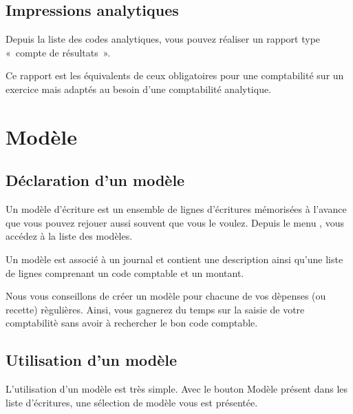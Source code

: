 \documentclass[a4paper,10pt,oneside,french]{sphinxmanual}
\begin{document}
\subsection{Impressions analytiques}
\label{\detokenize{accounting/costaccounting:impressions-analytiques}}
Depuis la liste des codes analytiques, vous pouvez réaliser un rapport type « compte de résultats ».

Ce rapport est les équivalents de ceux obligatoires pour une comptabilité sur un exercice mais adaptés au besoin d’une comptabilité analytique.


\section{Modèle}
\label{\detokenize{accounting/model:modele}}\label{\detokenize{accounting/model::doc}}

\subsection{Déclaration d’un modèle}
\label{\detokenize{accounting/model:declaration-d-un-modele}}
Un modèle d’écriture est un ensemble de lignes d’écritures mémorisées à l’avance que vous pouvez rejouer aussi souvent que vous le voulez.
Depuis le menu , vous accédez à la liste des modèles.
\begin{quote}

\noindent{}
\end{quote}

Un modèle est associé à un journal et contient une description ainsi qu’une liste de lignes comprenant un code comptable et un montant.
\begin{quote}

\noindent{}
\end{quote}

Nous vous conseillons de créer un modèle pour chacune de vos dèpenses (ou recette) règulières. Ainsi, vous gagnerez du temps sur la saisie de votre comptabilitè sans avoir à rechercher le bon code comptable.


\subsection{Utilisation d’un modèle}
\label{\detokenize{accounting/model:utilisation-d-un-modele}}
L’utilisation d’un modèle est très simple. Avec le bouton Modèle présent dans les liste d’écritures, une sélection de modèle vous est présentée.
\begin{quote}

\noindent{}
\end{quote}
\end{document}
